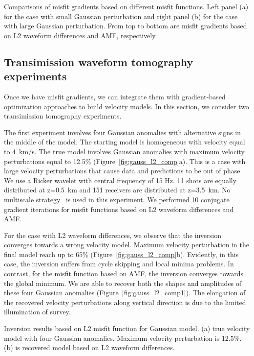 {\label{fig:grad_comp_grad}
Comparisons of misfit gradients based on different misfit functions.
Left panel (a) for the case with small Gaussian perturbation and right panel (b) for the 
case with large Gaussian perturbation. From top to bottom are misfit gradients based 
on L2 waveform differences and AMF, respectively.}

\subsection{Transimission waveform tomography experiments}
Once we have misfit gradients, we can integrate them with gradient-based optimization 
approaches to build velocity models. In this section, we consider two transimission 
tomography experiments.

The first experiment involves four Gaussian anomalies with alternative signs in 
the middle of the model. The starting model is homogeneous with velocity equal to 4~km/s. 
The true model involves Gaussian anomalies with maximum velocity perturbations equal 
to 12.5\% (Figure~\ref{fig:gauss_l2_comp}a). This is a case with large velocity perturbations that cause data and 
predictions to be out of phase. We use a Ricker wavelet with central frequency of 15 Hz. 
11 shots are equally distributed 
at z=0.5~km and 151 receivers are distributed at z=3.5~km. No multiscale 
strategy~\citep{Bunks1995, SirguePratt2004} is used in this experiment. 
We performed 10 conjugate gradient iterations for misfit functions based on 
L2 waveform differences and AMF. 

For the case with L2 waveform differences, we observe that the inversion converges towards 
a wrong velocity model. Maximum velocity perturbation in the final model reach up to 65\% (Figure~\ref{fig:gauss_l2_comp}b). 
Evidently, in this case, the inversion suffers from cycle skipping and local minima problems. 
In contrast, for the misfit function based on AMF, the inversion converges towards the global 
minimum. We are able to recover both the shapes and amplitudes of these four Gaussian 
anomalies (Figure~\ref{fig:gauss_l2_comp1}). The elongation of the recovered velocity perturbations along vertical direction is due to 
the limited illumination of survey. 

{\label{fig:gauss_l2_comp}
Inversion results based on L2 misfit function for Gaussian model. (a) true velocity model 
with four Gaussian anomalies. Maximum velocity perturbation is 12.5\%. 
(b) is recovered model based on L2 waveform differences.} 

